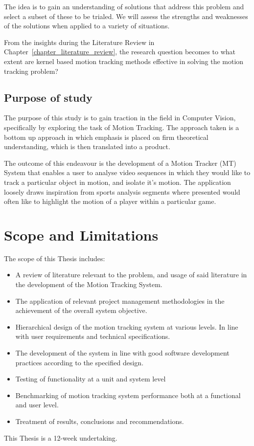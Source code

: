 The idea is to gain an understanding of solutions that address this problem and
select a subset of these to be trialed. We will assess the strengths and
weaknesses of the solutions when applied to a variety of situations.

From the insights during the Literature Review in Chapter~\ref{chapter_literature_review}, the
research question becomes to what extent are kernel based motion tracking
methods effective in solving the motion tracking problem?

\subsection{Purpose of study}\label{introduction_purpose}
The purpose of this study is to gain traction in the field in Computer Vision,
specifically by exploring the task of Motion Tracking. The approach taken is a
bottom up approach in which emphasis is placed on firm theoretical
understanding, which is then translated into a product.

The outcome of this endeavour is the development of a Motion Tracker
(MT) System that enables a user to analyse video sequences in which they would like
to track a particular object in motion, and isolate it's motion. The application
loosely draws inspiration from sports analysis segments where presented would often like
to highlight the motion of a player within a particular game.

\section{Scope and Limitations}\label{introduction_scope}
The scope of this Thesis includes: 
\begin{itemize}
    \item A review of literature relevant to the problem, and usage of
        said literature in the development of the Motion Tracking System.
    \item The application of relevant project management methodologies in the
        achievement of the overall system objective.
    \item Hierarchical design of the motion tracking system at various levels.
        In line with user requirements and technical specifications.
    \item The development of the system in line with good software development
        practices according to the specified design.
    \item Testing of functionality at a unit and system level
    \item Benchmarking of motion tracking system performance both at a
        functional and user level.
    \item Treatment of results, conclusions and recommendations.
\end{itemize}
This Thesis is a 12-week undertaking.

